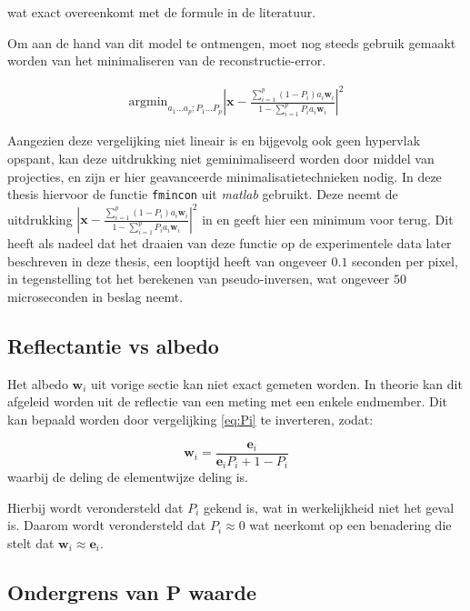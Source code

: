 \documentclass[12pt]{report}
\begin{document}
wat exact overeenkomt met de formule in de literatuur\cite{mlinmix}.

Om aan de hand van dit model te ontmengen, moet nog steeds gebruik gemaakt worden van het minimaliseren van de reconstructie-error. 

\begin{align}
\text{argmin}_{a_1 ... a_p; P_1 ... P_p} \left| \bm{x} - \frac{\sum_{i=1}^p (1-P_i) a_{i} \bm{w}_{i}}{1-\sum_{i=1}^p P_i a_{i} \bm{w}_{i}} \right|^2
\end{align}

Aangezien deze vergelijking niet lineair is en bijgevolg ook geen hypervlak opspant, kan deze uitdrukking niet geminimaliseerd worden door middel van projecties, en zijn er hier geavanceerde minimalisatietechnieken nodig. In deze thesis hiervoor de functie \texttt{fmincon} uit \textit{matlab}\cite{matlab} gebruikt. Deze neemt de uitdrukking $\left| \bm{x} - \frac{\sum_{i=1}^p (1-P_i) a_{i} \bm{w}_{i}}{1-\sum_{i=1}^p P_i a_{i} \bm{w}_{i}} \right|^2$ in en geeft hier een minimum voor terug. Dit heeft als nadeel dat het draaien van deze functie op de experimentele data later beschreven in deze thesis, een looptijd heeft van ongeveer $0.1$ seconden per pixel, in tegenstelling tot het berekenen van pseudo-inversen, wat ongeveer $50$ microseconden in beslag neemt. 

\subsection{Reflectantie vs albedo}

Het albedo $\bm{w}_i$ uit vorige sectie kan niet exact gemeten worden. In theorie kan dit afgeleid worden uit de reflectie van een meting met een enkele endmember. Dit kan bepaald worden door vergelijking \ref{eq:Pi} te inverteren, zodat:

\begin{equation}
\bm{w}_i = \frac{\bm{e}_i}{\bm{e}_iP_i + 1 - P_i}
\end{equation}
waarbij de deling de elementwijze deling is. 

Hierbij wordt verondersteld dat $P_i$ gekend is, wat in werkelijkheid niet het geval is. Daarom wordt verondersteld dat $P_i \approx 0$ wat neerkomt op een benadering die stelt dat $\bm{w}_i \approx \bm{e}_i$. 

\subsection{Ondergrens van P waarde}
\end{document}
